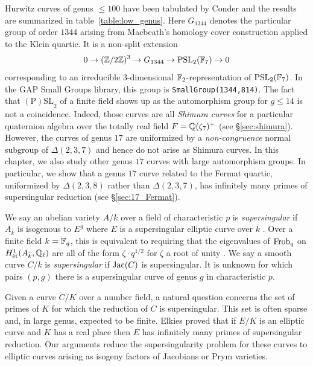 \documentclass[main.tex]{subfiles}
\begin{document}
Hurwitz curves of genus $\le 100$ have been tabulated by Conder \cite{Conder:survey, Conder:update} and the results are summarized in table~\ref{table:low_genus}. Here $G_{1344}$ denotes the particular group of order $1344$ arising from Macbeath's homology cover construction \cite{Macbeath:eightfold, macbeath:hurwitz_theorem} applied to the Klein quartic. It is a non-split extension
\[ 0 \to (\mathbb{Z}/2\mathbb{Z})^3 \to G_{1344} \to \mathrm{PSL}_2(\mathbb{F}_7) \to 0 \]
corresponding to an irreducible $3$-dimensional $\mathbb{F}_2$-representation of $\mathrm{PSL}_2(\mathbb{F}_7)$. In the GAP Small Groups library, this group is \texttt{SmallGroup(1344,814)}. The fact that $\mathrm{(P)SL}_2$ of a finite field shows up as the automorphism group for $g \le 14$ is not a coincidence. Indeed, those curves are all \textit{Shimura curves} for a particular quaternion algebra over the totally real field $F = \mathbb{Q}(\zeta_7)^+$ (see \S\ref{sec:shimura}). However, the curves of genus $17$ are uniformized by a \textit{non-congruence} normal subgroup of $\Delta(2,3,7)$ and hence do not arise as Shimura curves. In this chapter, we also study other genus $17$ curves with large automorphism groups. In particular, we show that a genus $17$ curve related to the Fermat quartic, uniformized by $\Delta(2,3,8)$ rather than $\Delta(2,3,7)$, has infinitely many primes of supersingular reduction (see \S\ref{sec:17_Fermat}).
\par 
We say an abelian variety $A / k$ over a field of characteristic $p$ is \textit{supersingular} if $A_{\bar{k}}$ is isogenous to $E^g$ where $E$ is a supersingular elliptic curve over $\bar{k}$ \cite{Oort:subvarieties}. Over a finite field $k = \mathbb{F}_q$, this is equivalent to requiring that the eigenvalues of $\operatorname{\mathrm{Frob}}_q$ on $H_{\mathrm{\acute{e}t}}^1(A_{\bar{k}}, \mathbb{Q}_{\ell})$ are all of the form $\zeta \cdot q^{1/2}$ for $\zeta$ a root of unity \cite{tate:endomorphisms}. We say a smooth curve $C / k$ is \textit{supersingular} if $\operatorname{\mathrm{Jac}}(C)$ is supersingular. It is unknown for which pairs $(p,g)$ there is a supersingular curve of genus $g$ in characteristic $p$.
\par
Given a curve $C / K$ over a number field, a natural question concerns the set of primes of $K$ for which the reduction of $C$ is supersingular. This set is often sparse and, in large genus, expected to be finite. Elkies \cite{elkies:supersingular} proved that if $E / K$ is an elliptic curve and $K$ has a real place then $E$ has infinitely many primes of supersingular reduction. Our arguments reduce the supersingularity problem for these curves to elliptic curves arising as isogeny factors of Jacobians or Prym varieties.
\end{document}
